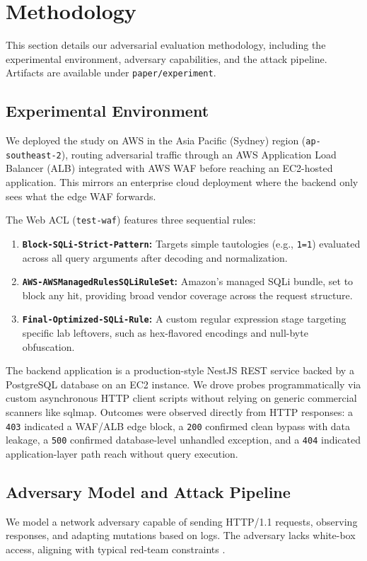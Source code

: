 \section{Methodology}
\label{sec:methodology}
This section details our adversarial evaluation methodology, including the experimental environment, adversary capabilities, and the attack pipeline. Artifacts are available under \texttt{paper/experiment}.

\subsection{Experimental Environment}
We deployed the study on AWS in the Asia Pacific (Sydney) region (\texttt{ap-southeast-2}), routing adversarial traffic through an AWS Application Load Balancer (ALB) integrated with AWS WAF before reaching an EC2-hosted application. This mirrors an enterprise cloud deployment where the backend only sees what the edge WAF forwards. 

The Web ACL (\texttt{test-waf}) features three sequential rules:
\begin{enumerate}
  \item \textbf{\texttt{Block-SQLi-Strict-Pattern}:} Targets simple tautologies (e.g., \texttt{1=1}) evaluated across all query arguments after decoding and normalization.
  \item \textbf{\texttt{AWS-AWSManagedRulesSQLiRuleSet}:} Amazon's managed SQLi bundle, set to block any hit, providing broad vendor coverage across the request structure.
  \item \textbf{\texttt{Final-Optimized-SQLi-Rule}:} A custom regular expression stage targeting specific lab leftovers, such as hex-flavored encodings and null-byte obfuscation.
\end{enumerate}

The backend application is a production-style NestJS REST service backed by a PostgreSQL database on an EC2 instance. We drove probes programmatically via custom asynchronous HTTP client scripts without relying on generic commercial scanners like sqlmap. Outcomes were observed directly from HTTP responses: a \texttt{403} indicated a WAF/ALB edge block, a \texttt{200} confirmed clean bypass with data leakage, a \texttt{500} confirmed database-level unhandled exception, and a \texttt{404} indicated application-layer path reach without query execution.


\subsection{Adversary Model and Attack Pipeline}
We model a network adversary capable of sending HTTP/1.1 requests, observing responses, and adapting mutations based on logs. The adversary lacks white-box access, aligning with typical red-team constraints \cite{guan2023ssqli,demetrio2020wafamole}. 

